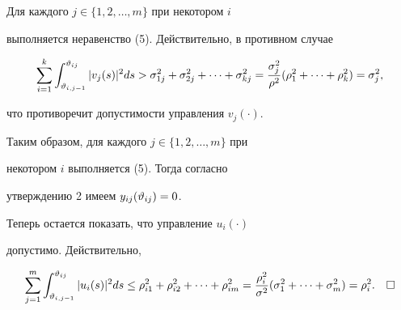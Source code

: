 Для каждого $j \in \{1, 2, \dotsc, m \} $ при некотором $i $


выполняется неравенство (5). Действительно, в противном случае


$$


\sum\limits_{i=1}^k\int_{\v_{i,j-1}}^{\v_{ij}}|v_j(s)|^2ds


> \s_{1j}^2 + \s_{2j}^2 + \dotsb + \s_{kj}^2 =


\frac{\s_j^2}{\rho^2}(\rho_1^2 + \dotsb + \rho_k^2) = \s_j^2,


$$


что противоречит допустимости управления $v_j(\cdot)$.





Таким образом, для каждого $j \in \{1, 2, \dotsc, m \} $ при


некотором $i $ выполняется (5). Тогда согласно


утверждению 2 имеем $y_{ij}(\vartheta_{ij}) = 0$.





Теперь остается показать, что управление $u_i(\cdot)$


допустимо. Действительно,


$$


\sum\limits_{j=1}^m\int_{\v_{i,j-1}}^{\v_{ij}}|u_i(s)|^2ds


\leq \rho_{i1}^2 + \rho_{i2}^2 + \dotsb + \rho_{im}^2


= \frac{\rho_i^2}{\s^2}(\s_1^2 + \dotsb + \s_m^2) = \rho_i^2.


\quad\square


$$





